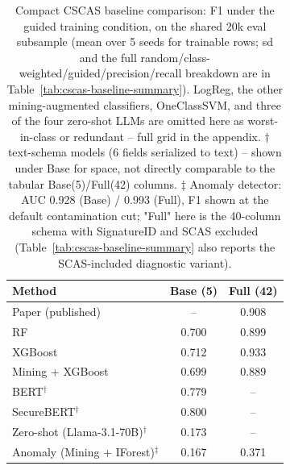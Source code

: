 \begin{table}[htbp]
\centering
\small
\caption{Compact CSCAS baseline comparison: F1 under the guided training
condition, on the shared 20k eval subsample (mean over 5 seeds for trainable
rows; sd and the full random/class-weighted/guided/precision/recall
breakdown are in Table~\ref{tab:cscas-baseline-summary}). LogReg, the other
mining-augmented classifiers, OneClassSVM, and three of the four zero-shot
LLMs are omitted here as worst-in-class or redundant -- full grid in the
appendix.
$\dagger$ text-schema models (6 fields serialized to text) -- shown under
Base for space, not directly comparable to the tabular Base(5)/Full(42)
columns.
$\ddagger$ Anomaly detector: AUC 0.928 (Base) / 0.993 (Full), F1 shown at
the default contamination cut; "Full" here is the 40-column schema with
SignatureID and SCAS excluded (Table~\ref{tab:cscas-baseline-summary} also
reports the SCAS-included diagnostic variant).}
\label{tab:cscas-compact-summary}
\begin{tabular}{lcc}
\toprule
\textbf{Method} & \textbf{Base (5)} & \textbf{Full (42)} \\
\midrule
Paper (published) & -- & 0.908 \\
\addlinespace
RF & 0.700 & 0.899 \\
XGBoost & 0.712 & 0.933 \\
Mining + XGBoost & 0.699 & 0.889 \\
\addlinespace
BERT$^\dagger$ & 0.779 & -- \\
SecureBERT$^\dagger$ & 0.800 & -- \\
Zero-shot (Llama-3.1-70B)$^\dagger$ & 0.173 & -- \\
\addlinespace
Anomaly (Mining + IForest)$^\ddagger$ & 0.167 & 0.371 \\
\bottomrule
\end{tabular}
\end{table}
